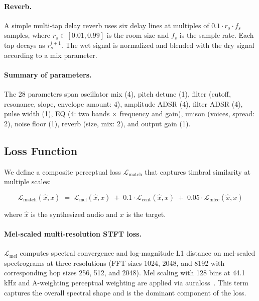 \paragraph{Reverb.} A simple multi-tap delay reverb uses six delay lines at multiples of $0.1 \cdot r_s \cdot f_s$ samples, where $r_s \in [0.01, 0.99]$ is the room size and $f_s$ is the sample rate. Each tap decays as $r_s^{i+1}$. The wet signal is normalized and blended with the dry signal according to a mix parameter.

\paragraph{Summary of parameters.} The 28 parameters span oscillator mix (4), pitch detune (1), filter (cutoff, resonance, slope, envelope amount: 4), amplitude ADSR (4), filter ADSR (4), pulse width (1), EQ (4: two bands $\times$ frequency and gain), unison (voices, spread: 2), noise floor (1), reverb (size, mix: 2), and output gain (1).

\subsection{Loss Function}
\label{sec:loss}

We define a composite perceptual loss $\mathcal{L}_{\text{match}}$ that captures timbral similarity at multiple scales:

\begin{equation}
    \mathcal{L}_{\text{match}}(\hat{x}, x) \;=\; \mathcal{L}_{\text{mel}}(\hat{x}, x) \;+\; 0.1 \cdot \mathcal{L}_{\text{cent}}(\hat{x}, x) \;+\; 0.05 \cdot \mathcal{L}_{\text{mfcc}}(\hat{x}, x)
    \label{eq:loss}
\end{equation}

where $\hat{x}$ is the synthesized audio and $x$ is the target.

\paragraph{Mel-scaled multi-resolution STFT loss.} $\mathcal{L}_{\text{mel}}$ computes spectral convergence and log-magnitude L1 distance on mel-scaled spectrograms at three resolutions (FFT sizes 1024, 2048, and 8192 with corresponding hop sizes 256, 512, and 2048). Mel scaling with 128 bins at 44.1\,kHz and A-weighting perceptual weighting are applied via auraloss~\citep{steinmetz2020auraloss}. This term captures the overall spectral shape and is the dominant component of the loss.

